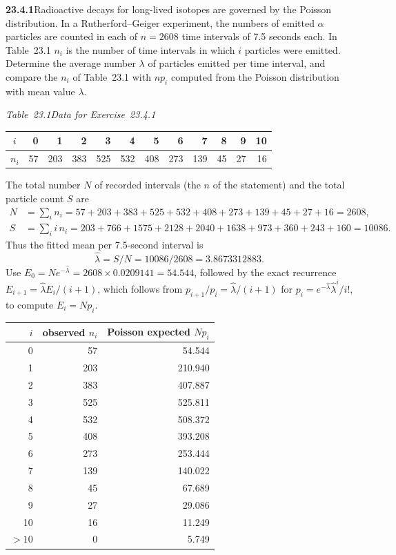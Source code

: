 \par\bigskip
\noindent\textbf{23.4.1}\quad Radioactive decays for long-lived
isotopes are governed by the Poisson distribution. In a
Rutherford--Geiger experiment, the numbers of emitted $\alpha$
particles are counted in each of $n=2608$ time intervals of 7.5
seconds each. In Table~23.1 $n_{i}$ is the number of time
intervals in which $i$ particles were emitted. Determine the
average number $\lambda$ of particles emitted per time interval,
and compare the $n_{i}$ of Table~23.1 with $np_{i}$ computed
from the Poisson distribution with mean value $\lambda$.
\begin{center}
\emph{Table~23.1\quad Data for Exercise~23.4.1}\\[4pt]
\begin{tabular}{c|*{11}{r}}
$i$ & 0 & 1 & 2 & 3 & 4 & 5 & 6 & 7 & 8 & 9 & 10\\
\hline
$n_{i}$ & 57 & 203 & 383 & 525 & 532 & 408 & 273 & 139 & 45 & 27
& 16
\end{tabular}
\end{center}
\solution
The total number $N$ of recorded intervals (the $n$ of the statement)
and the total particle count $S$ are
\begin{align*}
N&=\sum_in_i=57+203+383+525+532+408+273+139+45+27+16=2608,\\
S&=\sum_i i\,n_i=203+766+1575+2128+2040+1638+973+360+243+160=10086.
\end{align*}
Thus the fitted mean per 7.5-second interval is
\[
\boxed{\widehat\lambda=S/N=10086/2608=3.8673312883}.
\]
Use $E_0=Ne^{-\widehat\lambda}=2608\times0.0209141=54.544$, followed by
the exact recurrence $E_{i+1}=\widehat\lambda E_i/(i+1)$, which follows
from $p_{i+1}/p_i=\widehat\lambda/(i+1)$ for
$p_i=e^{-\widehat\lambda}\widehat\lambda^i/i!$, to compute $E_i=Np_i$.
\begin{center}
\begin{tabular}{r|r|r}
$i$&observed $n_i$&Poisson expected $Np_i$\\\hline
0&57&54.544\\1&203&210.940\\2&383&407.887\\
3&525&525.811\\4&532&508.372\\5&408&393.208\\
6&273&253.444\\7&139&140.022\\8&45&67.689\\
9&27&29.086\\10&16&11.249\\$>10$&0&5.749
\end{tabular}
\end{center}
